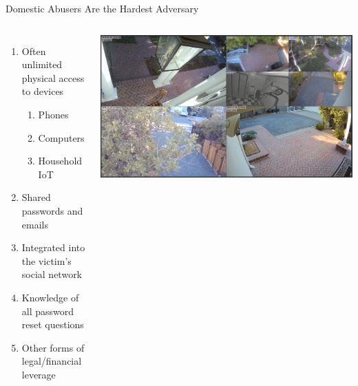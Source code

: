 \documentclass[nobackground,dvipsnames,table]{beamer}
\begin{document}
\begin{frame}{Domestic Abusers Are the Hardest Adversary}
    \begin{columns}
            \begin{enumerate}
                \item Often unlimited physical access to devices
                \begin{enumerate}
                    \item Phones
                    \item Computers
                    \item Household IoT
                \end{enumerate}
                \item Shared passwords and emails
                \item Integrated into the victim’s social network
                \item Knowledge of all password reset questions
                \item Other forms of legal/financial leverage
            \end{enumerate}
            \includegraphics[width=\textwidth]{security-cameras}
    \end{columns}
\end{frame}
\end{document}
